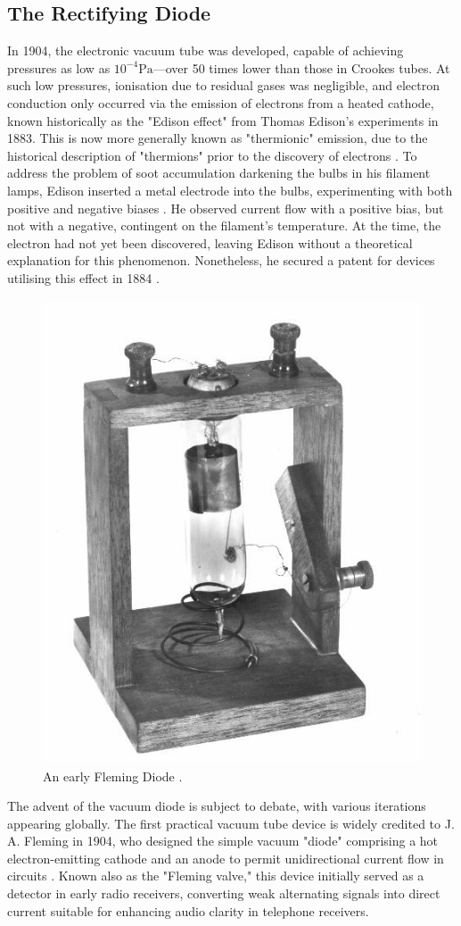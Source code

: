 \begin{refsection}
\subsection{The Rectifying Diode}
In 1904, the electronic vacuum tube was developed, capable of achieving pressures as low as $10^{-4}\si{\pascal}$—over 50 times lower than those in Crookes tubes. At such low pressures, ionisation due to residual gases was negligible, and electron conduction only occurred via the emission of electrons from a heated cathode, known historically as the "Edison effect" from Thomas Edison's experiments in 1883. This is now more generally known as "thermionic" emission, due to the historical description of "thermions" prior to the discovery of electrons \cite{thomson:1903}. To address the problem of soot accumulation darkening the bulbs in his filament lamps, Edison inserted a metal electrode into the bulbs, experimenting with both positive and negative biases \cite{nebeker:2009}. He observed current flow with a positive bias, but not with a negative, contingent on the filament's temperature. At the time, the electron had not yet been discovered, leaving Edison without a theoretical explanation for this phenomenon. Nonetheless, he secured a patent for devices utilising this effect in 1884 \cite{edison:1884}.

\begin{figure}[h]
\centering
\includegraphics[width=0.4\linewidth]{Chapter1/gfx/fleming_diode.jpg}
\caption{An early Fleming Diode \cite{ethw:2008}.}
\label{fig:fleming_diode}
\end{figure}

The advent of the vacuum diode is subject to debate, with various iterations appearing globally. The first practical vacuum tube device is widely credited to J. A. Fleming in 1904, who designed the simple vacuum "diode" comprising a hot electron-emitting cathode and an anode to permit unidirectional current flow in circuits \cite{fleming:1905}. Known also as the "Fleming valve," this device initially served as a detector in early radio receivers, converting weak alternating signals into direct current suitable for enhancing audio clarity in telephone receivers.%



\end{refsection}
